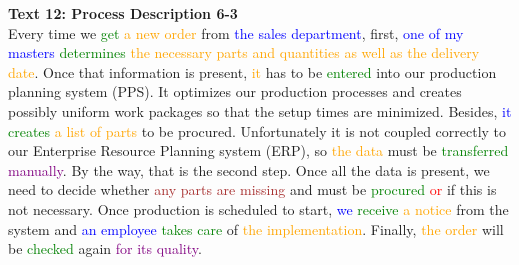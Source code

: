 \textbf{Text 12: Process Description 6-3}\\
Every time we \textcolor{green}{get} \textcolor{orange}{a} \textcolor{orange}{new} \textcolor{orange}{order} from \textcolor{blue}{the} \textcolor{blue}{sales} \textcolor{blue}{department}, first, \textcolor{blue}{one} \textcolor{blue}{of} \textcolor{blue}{my} \textcolor{blue}{masters} \textcolor{green}{determines} \textcolor{orange}{the} \textcolor{orange}{necessary} \textcolor{orange}{parts} \textcolor{orange}{and} \textcolor{orange}{quantities} \textcolor{orange}{as} \textcolor{orange}{well} \textcolor{orange}{as} \textcolor{orange}{the} \textcolor{orange}{delivery} \textcolor{orange}{date}. Once that information is present, \textcolor{orange}{it} has to be \textcolor{green}{entered} into our production planning system (PPS). It optimizes our production processes and creates possibly uniform work packages so that the setup times are minimized. Besides, \textcolor{blue}{it} \textcolor{green}{creates} \textcolor{orange}{a} \textcolor{orange}{list} \textcolor{orange}{of} \textcolor{orange}{parts} to be procured. Unfortunately it is not coupled correctly to our Enterprise Resource Planning system (ERP), so \textcolor{orange}{the} \textcolor{orange}{data} must be \textcolor{green}{transferred} \textcolor{purple}{manually}. By the way, that is the second step. Once all the data is present, we need to decide whether \textcolor{brown}{any} \textcolor{brown}{parts} \textcolor{brown}{are} \textcolor{brown}{missing} and must be \textcolor{green}{procured} \textcolor{red}{or} if this is not necessary. Once production is scheduled to start, \textcolor{blue}{we} \textcolor{green}{receive} \textcolor{orange}{a} \textcolor{orange}{notice} from the system and \textcolor{blue}{an} \textcolor{blue}{employee} \textcolor{green}{takes} \textcolor{green}{care} of \textcolor{orange}{the} \textcolor{orange}{implementation}. Finally, \textcolor{orange}{the} \textcolor{orange}{order} will be \textcolor{green}{checked} again \textcolor{purple}{for} \textcolor{purple}{its} \textcolor{purple}{quality}.

